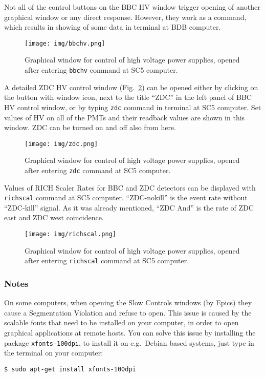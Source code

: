 Not all of the control buttons on the BBC HV window trigger opening of another graphical window or any direct response. However, they work as a command, which results in showing of some data in terminal at BDB computer.

 
\begin{figure}[htb]
  \begin{center}
    \texttt{[image: img/bbchv.png]}
  \end{center}
  \caption{Graphical window for control of high voltage power supplies, opened after entering \texttt{bbchv} command at SC5 computer.}
\label{bbchv}
\end{figure}

A detailed ZDC HV control window (Fig.~\ref{zdcwindow}) can be opened either by clicking on the button with window icon, next to the title ``ZDC'' in the left panel of BBC HV control window, or by typing \texttt{zdc} command in terminal at SC5 computer. Set values of HV on all of the PMTs and their readback values are shown in this window.  ZDC can be turned on and off also from here.

\begin{figure}[htb]
  \begin{center}
    \texttt{[image: img/zdc.png]}
  \end{center}
  \caption{Graphical window for control of high voltage power supplies, opened after entering \texttt{zdc} command at SC5 computer.}
\label{zdcwindow}
\end{figure}

Values of RICH Scaler Rates for BBC and ZDC detectors can be displayed with \texttt{richscal} command at SC5 computer. ``ZDC-nokill'' is the event rate without ``ZDC-kill'' signal. As it was already mentioned, ``ZDC And'' is the rate of ZDC east and ZDC west coincidence.

\begin{figure}[htb]
  \begin{center}
    \texttt{[image: img/richscal.png]}
  \end{center}
  \caption{Graphical window for control of high voltage power supplies, opened after entering \texttt{richscal} command at SC5 computer.}
\label{richscal}
\end{figure}


\subsubsection{Notes}
On some computers, when opening the Slow Controls windows (by Epics) they cause a Segmentation Violation and refuse to open. This issue is caused by the scalable fonts that need to be installed on your computer, in order to open graphical applications at remote hosts.
You can solve this issue by installing the package \texttt{xfonts-100dpi}, to install it on e.g.\ Debian based systems, just type in the terminal on your computer:
\begin{verbatim}
$ sudo apt-get install xfonts-100dpi
\end{verbatim}


